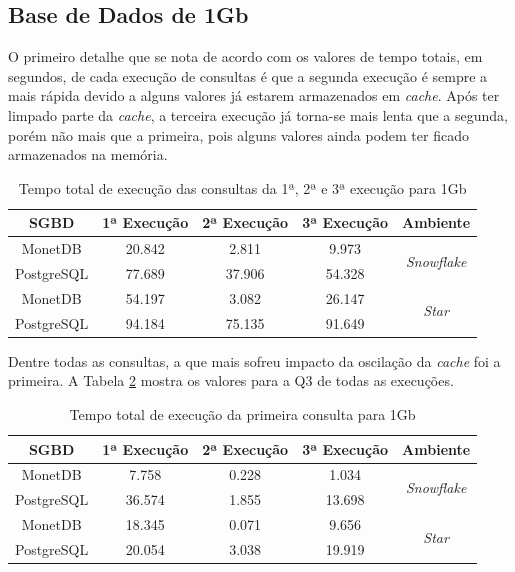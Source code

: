 \subsection{Base de Dados de 1Gb}

O primeiro detalhe que se nota de acordo com os valores de tempo totais, em segundos, de cada execução de consultas é que a segunda execução é sempre a mais rápida devido a alguns valores já estarem armazenados em \textit{cache}. Após ter limpado parte da \textit{cache}, a terceira execução já torna-se mais lenta que a segunda, porém não mais que a primeira, pois alguns valores ainda podem ter ficado armazenados na memória.

\begin{table}[htpb]
        \centering
        \caption{Tempo total de execução das consultas da 1ª, 2ª e 3ª execução para 1Gb}
        \label{tab:queries_cache_1}
        \begin{tabular}{|c|c|c|c|c|}
        \hline
        SGBD       & 1ª Execução & 2ª Execução & 3ª Execução & Ambiente                            \\ \hline
        MonetDB    & 20.842      & 2.811       & 9.973       & \multirow{2}{*}{\textit{Snowflake}} \\ \cline{1-4}
        PostgreSQL & 77.689      & 37.906      & 54.328      &                                     \\ \hline
        MonetDB    & 54.197      & 3.082       & 26.147      & \multirow{2}{*}{\textit{Star}}      \\ \cline{1-4}
        PostgreSQL & 94.184      & 75.135      & 91.649      &                                     \\ \hline
        \end{tabular}
\end{table}

Dentre todas as consultas, a que mais sofreu impacto da oscilação da \textit{cache} foi a primeira. A Tabela \ref{tab:q1_cache_1} mostra os valores para a Q3 de todas as execuções.

\begin{table}[htpb]
        \centering
        \caption{Tempo total de execução da primeira consulta para 1Gb}
        \label{tab:q1_cache_1}
        \begin{tabular}{|c|c|c|c|c|}
        \hline
        SGBD       & 1ª Execução & 2ª Execução & 3ª Execução & Ambiente                            \\ \hline
        MonetDB    & 7.758       & 0.228       & 1.034       & \multirow{2}{*}{\textit{Snowflake}} \\ \cline{1-4}
        PostgreSQL & 36.574      & 1.855       & 13.698      &                                     \\ \hline
        MonetDB    & 18.345      & 0.071       & 9.656       & \multirow{2}{*}{\textit{Star}}      \\ \cline{1-4}
        PostgreSQL & 20.054      & 3.038       & 19.919      &                                     \\ \hline
\end{tabular}
\end{table}


